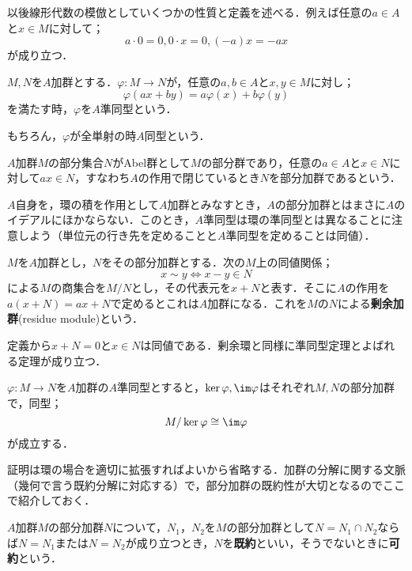 以後線形代数の模倣としていくつかの性質と定義を述べる．例えば任意の$a\in A$と$x\in M$に対して；
\[a\cdot0=0, 0\cdot x=0,(-a)x=-ax\]
が成り立つ．

\begin{defi}[準同型]
	$M,N$を$A$加群とする．$\varphi:M\to N$が，任意の$a,b\in A$と$x,y\in M$に対し；
	\[\varphi(ax+by)=a\varphi(x)+b\varphi(y)\]
	を満たす時，$\varphi$を$A$準同型という．
\end{defi}

もちろん，$\varphi$が全単射の時$A$同型という．

\begin{defi}[部分加群]
	$A$加群$M$の部分集合$N$がAbel群として$M$の部分群であり，任意の$a\in A$と$x\in N$に対して$ax\in N，$すなわち$A$の作用で閉じているとき$N$を部分加群であるという．
\end{defi}

$A$自身を，環の積を作用として$A$加群とみなすとき，$A$の部分加群とはまさに$A$のイデアルにほかならない．このとき，$A$準同型は環の準同型とは異なることに注意しよう（単位元の行き先を定めることと$A$準同型を定めることは同値）．

\begin{defi}[剰余加群]
	$M$を$A$加群とし，$N$をその部分加群とする．次の$M$上の同値関係；
	\[x\sim y\Longleftrightarrow x-y\in N\]
	による$M$の商集合を$M/N$とし，その代表元を$x+N$と表す．そこに$A$の作用を$a(x+N)=ax+N$で定めるとこれは$A$加群になる．これを$M$の$N$による\textbf{剰余加群}(residue module)という．
\end{defi}

定義から$x+N=0$と$x\in N$は同値である．剰余環と同様に準同型定理とよばれる定理が成り立つ．

\begin{thm}[準同型定理]
	$\varphi:M\to N$を$A$加群の$A$準同型とすると，$\ker\varphi,\im\varphi$はそれぞれ$M,N$の部分加群で，同型；
	\[M/\ker\varphi\cong\im\varphi\]
	が成立する．
\end{thm}

証明は環の場合を適切に拡張すればよいから省略する．加群の分解に関する文脈（幾何で言う既約分解に対応する）で，部分加群の既約性が大切となるのでここで紹介しておく．

\begin{defi}\label{defi:既約部分加群}
	$A$加群$M$の部分加群$N$について，$N_1，N_2$を$M$の部分加群として$N=N_1\cap N_2$ならば$N=N_1$または$N=N_2$が成り立つとき，$N$を\textbf{既約}といい，そうでないときに\textbf{可約}という．
\end{defi}

